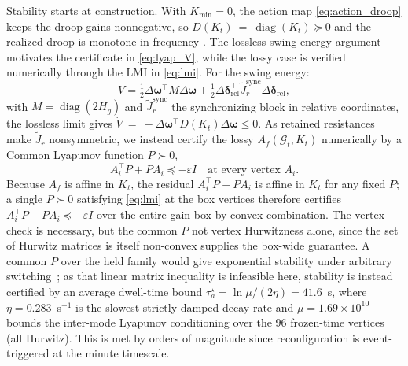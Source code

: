 \documentclass[lettersize,journal]{IEEEtran}
\begin{document}
	Stability starts at construction. With $K_{\min}=0$, the action map \eqref{eq:action_droop} keeps the droop gains nonnegative, so $D(K_t)~=~\operatorname{diag}(K_t)\succeq0$ and the realized droop is monotone in frequency \cite{zhang2026vppsafety,alduaij2025partialmonotone}. The lossless swing-energy argument motivates the certificate in \eqref{eq:lyap_V}, while the lossy case is verified numerically through the LMI in \eqref{eq:lmi}. For the swing energy:
	\begin{equation}
		V=\tfrac12\Delta\boldsymbol{\omega}^{\!\top}M\Delta\boldsymbol{\omega}
		+
		\tfrac12\Delta\boldsymbol{\delta}_{\mathrm{rel}}^{\!\top}\tilde{J}_r^{\mathrm{sync}}\Delta\boldsymbol{\delta}_{\mathrm{rel}},
		\label{eq:lyap_V}
	\end{equation}
	with $M=\operatorname{diag}(2H_g)$ and $\tilde{J}_r^{\mathrm{sync}}$ the synchronizing block in relative coordinates, the lossless limit gives $\dot V~=~-\Delta\boldsymbol{\omega}^{\!\top}D(K_t)\Delta\boldsymbol{\omega}\le0$. As retained resistances make $\tilde{J}_r$ nonsymmetric, we instead certify the lossy $A_f(\mathcal{G}_t,K_t)$ numerically by a Common Lyapunov function $P\succ0$,
	\begin{equation}
		A_i^{\!\top}P+PA_i\preceq-\varepsilon I \quad \text{at every vertex } A_i.
		\label{eq:lmi}
	\end{equation}
	Because $A_f$ is affine in $K_t$, the residual $A_i^{\!\top}P+PA_i$ is affine in $K_t$ for any fixed $P$; a single $P\succ0$ satisfying \eqref{eq:lmi} at the box vertices therefore certifies $A_i^{\!\top}P+PA_i\preceq-\varepsilon I$ over the entire gain box by convex combination. The vertex check is necessary, but the common $P$ not vertex Hurwitzness alone, since the set of Hurwitz matrices is itself non-convex supplies the box-wide guarantee. A common $P$ over the held family would give exponential stability under arbitrary switching~\cite{Liberzon2003SwitchingIS}; as that linear matrix inequality is infeasible here, stability is instead certified by an average dwell-time bound $\tau_a^{\star}=\ln\mu/(2\eta)=41.6$~s, where $\eta=0.283$~s$^{-1}$ is the slowest strictly-damped decay rate and $\mu=1.69\times10^{10}$ bounds the inter-mode Lyapunov conditioning over the $96$ frozen-time vertices (all Hurwitz). This is met by orders of magnitude since reconfiguration is event-triggered at the minute timescale.
	
\end{document}
